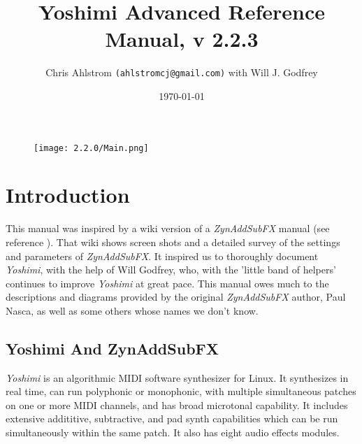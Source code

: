 \documentclass[
 11pt,
 twoside,
 a4paper,
 final                                 %
]{article}
\begin{document}
\title{Yoshimi Advanced Reference Manual, v 2.2.3}
\author{Chris Ahlstrom \texttt{(ahlstromcj@gmail.com)} with Will J. Godfrey}
\date{\today}
\maketitle

\begin{figure}[H]
   \centering
   \texttt{[image: 2.2.0/Main.png]}
\end{figure}

\clearpage                             %

\tableofcontents
\listoffigures                         %
\listoftables                          %

%

\setlength{\parindent}{2em}
\setlength{\parskip}{1ex plus 0.5ex minus 0.2ex}

\section{Introduction}
\label{sec:introduction}

   This manual was inspired by a wiki version of a
   \textsl{ZynAddSubFX} manual (see reference \cite{zynwiki}).  That wiki
   shows screen shots and a
   detailed survey of the settings and parameters of \textsl{ZynAddSubFX}.  It
   inspired us to thoroughly document \textsl{Yoshimi}, with the help of
   Will Godfrey, who, with the 'little band of helpers' continues to improve
   \textsl{Yoshimi} at great pace.
   This manual owes much to the descriptions and diagrams provided by the
   original \textsl{ZynAddSubFX} author, Paul Nasca, as well as some others
   whose names we don't know.

\subsection{Yoshimi And ZynAddSubFX}
\label{subsec:introduction_yoshimi_vs_zyn}

   \textsl{Yoshimi} is an algorithmic MIDI software synthesizer for Linux.
   It synthesizes in real time, can run polyphonic or monophonic, with multiple
   simultaneous patches on one or more MIDI channels, and has broad microtonal
   capability. It includes extensive addititive, subtractive,
   and pad synth capabilities which can be run simultaneously within the
   same patch.  It also has eight audio effects modules.
\end{document}
